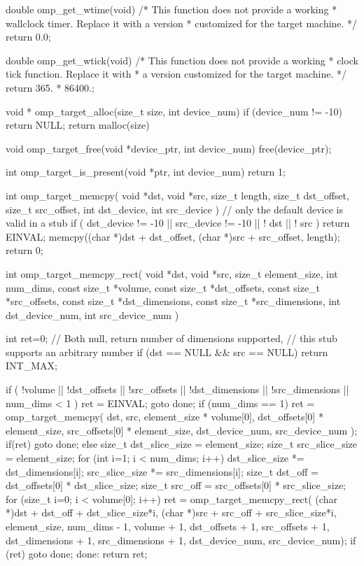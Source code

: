{\begin{ompcFunction}
double omp_get_wtime(void)
{
  /* This function does not provide a working
   * wallclock timer. Replace it with a version
   * customized for the target machine.
   */
  return 0.0;
}

double omp_get_wtick(void)
{
  /* This function does not provide a working
   * clock tick function. Replace it with
   * a version customized for the target machine.
   */
  return 365. * 86400.;
}

void * omp_target_alloc(size_t size, int device_num)
{
  if (device_num != -10)
  return NULL;
  return malloc(size)
}

void omp_target_free(void *device_ptr, int device_num)
{
  free(device_ptr);
}

int omp_target_is_present(void *ptr, int device_num)
{
  return 1;
}

int omp_target_memcpy(
  void *dst,
  void *src,
  size_t length,
  size_t dst_offset,
  size_t src_offset,
  int dst_device,
  int src_device
)
{
  // only the default device is valid in a stub
  if (
    dst_device != -10 || src_device != -10
    || ! dst || ! src )
  return EINVAL;
  memcpy((char *)dst + dst_offset,
    (char *)src + src_offset,
    length);
  return 0;
}

int omp_target_memcpy_rect(
  void *dst,
  void *src,
  size_t element_size,
  int num_dims,
  const size_t *volume,
  const size_t *dst_offsets,
  const size_t *src_offsets,
  const size_t *dst_dimensions,
  const size_t *src_dimensions,
  int dst_device_num,
  int src_device_num
)
{
  int ret=0;
  // Both null, return number of dimensions supported,
  // this stub supports an arbitrary number
  if (dst == NULL && src == NULL) return INT_MAX;

  if (
    !volume || !dst_offsets || !src_offsets
    || !dst_dimensions || !src_dimensions
    || num_dims < 1 ) {
    ret = EINVAL;
    goto done;
  }
  if (num_dims == 1) {
    ret = omp_target_memcpy(
      dst,
      src,
      element_size * volume[0],
      dst_offsets[0] * element_size,
      src_offsets[0] * element_size,
      dst_device_num,
      src_device_num
    );
    if(ret) goto done;
  } else {
    size_t dst_slice_size = element_size;
    size_t src_slice_size = element_size;
    for (int i=1; i < num_dims; i++) {
      dst_slice_size *= dst_dimensions[i];
      src_slice_size *= src_dimensions[i];
    }
    size_t dst_off = dst_offsets[0] * dst_slice_size;
    size_t src_off = src_offsets[0] * src_slice_size;
    for (size_t i=0; i < volume[0]; i++) {
      ret = omp_target_memcpy_rect(
        (char *)dst + dst_off + dst_slice_size*i,
        (char *)src + src_off + src_slice_size*i,
        element_size,
        num_dims - 1,
        volume + 1,
        dst_offsets + 1,
        src_offsets + 1,
        dst_dimensions + 1,
        src_dimensions + 1,
        dst_device_num,
        src_device_num);
      if (ret) goto done;
    }
  }
  done:
  return ret;
}


\end{ompcFunction}}
